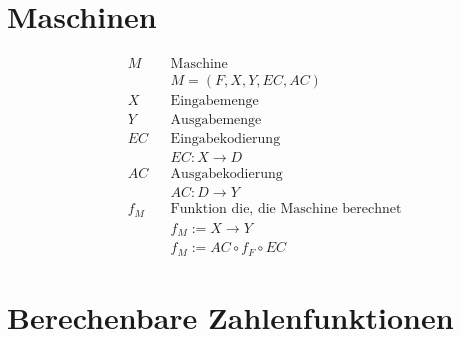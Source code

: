 \documentclass[10pt,oneside,a4paper]{scrartcl}
\begin{document}
\section{Maschinen}

    \begin{align}
    &M   && \text{Maschine}\nonumber\\
            &&&M = (F, X, Y, EC, AC)\\
    &X   && \text{Eingabemenge}\nonumber\\
    &Y   && \text{Ausgabemenge}\nonumber\\
    &EC  && \text{Eingabekodierung}\nonumber\\
            &&&EC : X \longrightarrow D\\
    &AC  && \text{Ausgabekodierung}\nonumber\\
            &&&AC : D \longrightarrow Y\\
    &f_M && \text{Funktion die, die Maschine berechnet}\nonumber\\
            &&&f_M := X \longrightarrow Y\\
            &&&f_M := AC \circ f_F \circ EC
    \end{align}

\section{Berechenbare Zahlenfunktionen}
\end{document}
